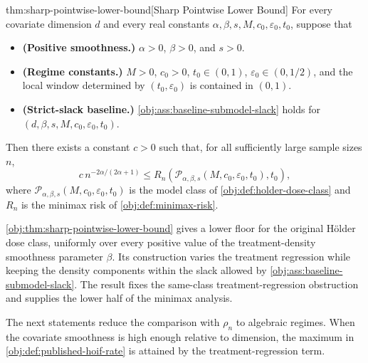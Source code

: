 \begin{theoremv}{thm:sharp-pointwise-lower-bound}[Sharp Pointwise Lower Bound]
For every covariate dimension $d$ and every real constants
$\alpha,\beta,s,M,c_0,\varepsilon_0,t_0$, suppose that
\begin{itemize}
\item \textbf{(Positive smoothness.)} $\alpha>0$, $\beta>0$, and $s>0$.
\item \textbf{(Regime constants.)} $M>0$, $c_0>0$, $t_0\in(0,1)$, $\varepsilon_0\in(0,1/2)$, and the local window determined by $(t_0,\varepsilon_0)$ is contained in $(0,1)$.
\item \textbf{(Strict-slack baseline.)} \cref{obj:ass:baseline-submodel-slack} holds for $(d,\beta,s,M,c_0,\varepsilon_0,t_0)$.
\end{itemize}
Then there exists a constant $c>0$ such that, for all sufficiently large sample sizes $n$,
\[
  c\, n^{-2\alpha/(2\alpha+1)}
  \le
  R_n\!\left(
    \mathcal P_{\alpha,\beta,s}(M,c_0,\varepsilon_0,t_0),
    t_0
  \right),
\]
where $\mathcal P_{\alpha,\beta,s}(M,c_0,\varepsilon_0,t_0)$ is the model class of \cref{obj:def:holder-dose-class} and $R_n$ is the minimax risk of \cref{obj:def:minimax-risk}.
\end{theoremv}

\cref{obj:thm:sharp-pointwise-lower-bound} gives a lower floor for the original Hölder dose class, uniformly over every positive value of the treatment-density smoothness parameter \(\beta\). Its construction varies the treatment regression while keeping the density components within the slack allowed by \cref{obj:ass:baseline-submodel-slack}. The result fixes the same-class treatment-regression obstruction and supplies the lower half of the minimax analysis.

The next statements reduce the comparison with \(\rho_n\) to algebraic regimes. When the covariate smoothness is high enough relative to dimension, the maximum in \cref{obj:def:published-hoif-rate} is attained by the treatment-regression term.

